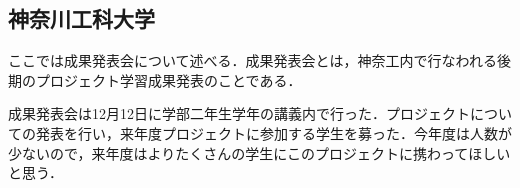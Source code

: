 \subsection{神奈川工科大学} 
\par ここでは成果発表会について述べる．成果発表会とは，神奈工内で行なわれる後期のプロジェクト学習成果発表のことである．
\par 成果発表会は12月12日に学部二年生学年の講義内で行った．プロジェクトについての発表を行い，来年度プロジェクトに参加する学生を募った．今年度は人数が少ないので，来年度はよりたくさんの学生にこのプロジェクトに携わってほしいと思う．
